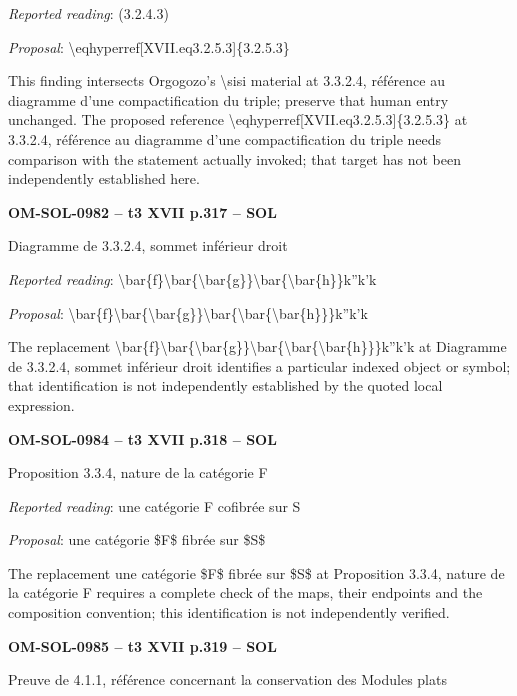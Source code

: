 \emph{Reported reading}: (3.2.4.3)\par
\emph{Proposal}: \textbackslash{}eqhyperref[XVII.eq3.2.5.3]\{3.2.5.3\}\par
This finding intersects Orgogozo's \textbackslash{}sisi material at 3.3.2.4, référence au diagramme d'une compactification du triple; preserve that human entry unchanged. The proposed reference \textbackslash{}eqhyperref[XVII.eq3.2.5.3]\{3.2.5.3\} at 3.3.2.4, référence au diagramme d'une compactification du triple needs comparison with the statement actually invoked; that target has not been independently established here.\par
\par\noindent\textbf{OM-SOL-0982 -- t3 XVII p.317 -- SOL}\par
Diagramme de 3.3.2.4, sommet inférieur droit\par
\emph{Reported reading}: \textbackslash{}bar\{f\}\textbackslash{}bar\{\textbackslash{}bar\{g\}\}\textbackslash{}bar\{\textbackslash{}bar\{h\}\}k''k'k\par
\emph{Proposal}: \textbackslash{}bar\{f\}\textbackslash{}bar\{\textbackslash{}bar\{g\}\}\textbackslash{}bar\{\textbackslash{}bar\{\textbackslash{}bar\{h\}\}\}k''k'k\par
The replacement \textbackslash{}bar\{f\}\textbackslash{}bar\{\textbackslash{}bar\{g\}\}\textbackslash{}bar\{\textbackslash{}bar\{\textbackslash{}bar\{h\}\}\}k''k'k at Diagramme de 3.3.2.4, sommet inférieur droit identifies a particular indexed object or symbol; that identification is not independently established by the quoted local expression.\par
\par\noindent\textbf{OM-SOL-0984 -- t3 XVII p.318 -- SOL}\par
Proposition 3.3.4, nature de la catégorie F\par
\emph{Reported reading}: une catégorie F cofibrée sur S\par
\emph{Proposal}: une catégorie \$F\$ fibrée sur \$S\$\par
The replacement une catégorie \$F\$ fibrée sur \$S\$ at Proposition 3.3.4, nature de la catégorie F requires a complete check of the maps, their endpoints and the composition convention; this identification is not independently verified.\par
\par\noindent\textbf{OM-SOL-0985 -- t3 XVII p.319 -- SOL}\par
Preuve de 4.1.1, référence concernant la conservation des Modules plats\par
